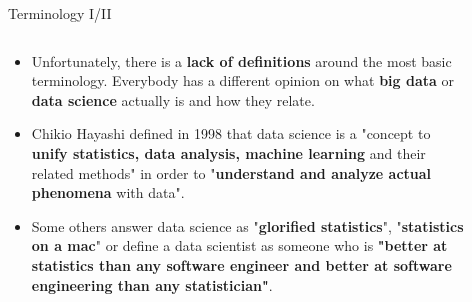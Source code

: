 \documentclass[main.tex]{subfiles}
\begin{document}
    \begin{frame}{Terminology I/II}
        \begin{columns}
            \begin{column}{.6\textwidth}
                \begin{itemize}
                    \item Unfortunately, there is a \textbf{lack of definitions} around the most basic terminology. Everybody has a different opinion on what \textbf{big data} or \textbf{data science} actually is and how they relate.
                    \item Chikio Hayashi defined in 1998 that data science is a "concept to \textbf{unify statistics, data analysis, machine learning} and their related methods" in order to "\textbf{understand and analyze actual phenomena} with data".
                    \item Some others answer data science as "\textbf{glorified statistics}", "\textbf{statistics on a mac}" or define a data scientist as someone who is \textbf{"better at statistics than any software engineer and better at software engineering than any statistician"}.
                \end{itemize}
            \end{column}
            \begin{column}{.4\textwidth}
                \begin{figure}
                    \label{fig:data-science-venn}
                    \begin{adjustbox}{width=0.7\textheight}
\end{adjustbox}
\end{figure}
\end{column}
\end{columns}
\end{frame}
\end{document}

